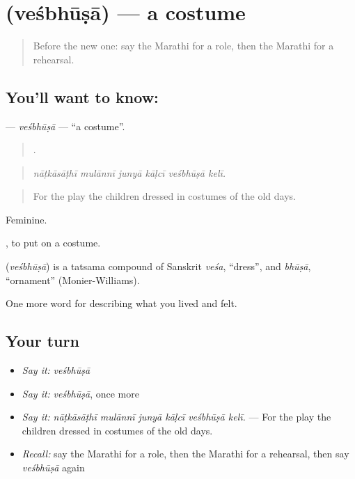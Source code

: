 \section[\texorpdfstring{\mr{वेशभूषा} (veśbhūṣā)}{वेशभूषा (veśbhūṣā)}]{ (veśbhūṣā) — a costume}

\label{lesson:MR-C537-vesbhusa}



\begin{quote}
Before the new one: say the Marathi for a role, then the Marathi for a rehearsal.
\end{quote}

\subsection*{You'll want to know: }
\textbf{} — \emph{veśbhūṣā} — \textquotedblleft{}a costume\textquotedblright{}.

\begin{quote}
     .
\end{quote}

\begin{quote}
\emph{nāṭkāsāṭhī mulānnī junyā kāḷcī veśbhūṣā kelī.}
\end{quote}

\begin{quote}
For the play the children dressed in costumes of the old days.
\end{quote}

Feminine.

 , to put on a costume.

\begin{cousinweb}
\textbf{} (\emph{veśbhūṣā}) is a tatsama compound of Sanskrit \emph{veśa}, \textquotedblleft{}dress\textquotedblright{}, and \emph{bhūṣā}, \textquotedblleft{}ornament\textquotedblright{} (Monier-Williams).
\end{cousinweb}

\begin{grammarlens}[title={What you've built}]
One more word for describing what you lived and felt.
\end{grammarlens}

\subsection*{Your turn}
\begin{itemize}
\raggedright
  \item \emph{Say it:} \emph{veśbhūṣā}
  \item \emph{Say it:} \emph{veśbhūṣā}, once more
  \item \emph{Say it:} \emph{nāṭkāsāṭhī mulānnī junyā kāḷcī veśbhūṣā kelī.} — For the play the children dressed in costumes of the old days.
  \item \emph{Recall:} say the Marathi for a role, then the Marathi for a rehearsal, then say \emph{veśbhūṣā} again
\end{itemize}

